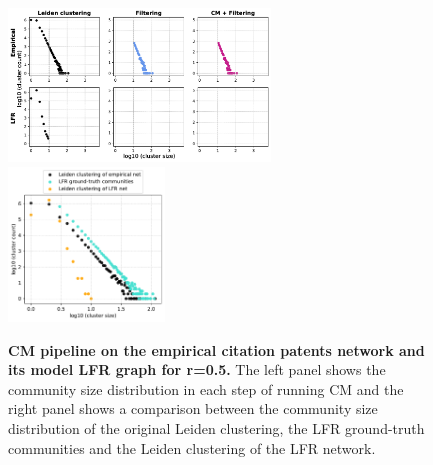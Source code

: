 \documentclass[a4paper]{article}   	%
\begin{document}
\begin{figure}[h!]
\centering
\includegraphics[width=0.62\textwidth]{figs/cit_patents_cm_steps_lfr5.pdf}
\includegraphics[width=0.37\textwidth]{figs/cit_patents_5_cm_size.pdf}
\caption[CM pipeline on the empirical citation patents network and its model LFR graph for r=0.5]{\textbf{CM pipeline on the empirical citation patents network and its model LFR graph for r=0.5.} The left panel shows the community size distribution in each step of running CM and the right panel shows a comparison between the community size distribution of the original Leiden clustering, the LFR ground-truth communities and the Leiden clustering of the LFR network.}
\label{fig:patents-cm-lfr-5}
\end{figure}
\end{document}
